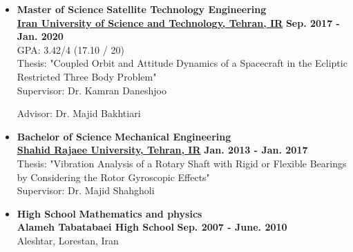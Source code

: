\documentclass[11pt,a4paper, sans]{moderncv}
\begin{document}
\begin{itemize}
	\item \textbf{Master of Science} \hfill \textbf{Satellite Technology Engineering} \\
	\href{http://www.iust.ac.ir/en}{\textbf{Iran University of Science and Technology, Tehran, IR}} \hfill \textbf{Sep. 2017 - Jan. 2020}\\ GPA: 3.42/4 (17.10 / 20) \\ Thesis: "Coupled Orbit and Attitude Dynamics of a Spacecraft in the Ecliptic Restricted Three Body Problem" \\ Supervisor: Dr. Kamran Daneshjoo
	\par 
	Advisor: Dr. Majid Bakhtiari
	\item \textbf{Bachelor of Science} \hfill \textbf{Mechanical Engineering} \\
	\href{https://sru.ac.ir/en}{\textbf{Shahid Rajaee University, Tehran, IR}} \hfill \textbf{Jan. 2013 - Jan. 2017} \\  Thesis: "Vibration Analysis of a Rotary Shaft with Rigid or Flexible Bearings by Considering the Rotor Gyroscopic Effects" \\ Supervisor: Dr. Majid Shahgholi
	
	
	\item \textbf{High School} \hfill \textbf{Mathematics and physics } \\
	{\textbf{Alameh Tabatabaei High School}} \hfill \textbf{Sep. 2007 - June. 2010} \\ Aleshtar, Lorestan, Iran   %
\end{itemize}
\end{document}
